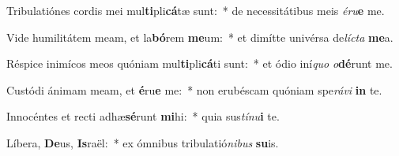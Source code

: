 \item Tribulatiónes cordis mei mul\textbf{ti}pli\textbf{cá}tæ sunt:~* de necessitátibus meis \textit{é}\textit{ru}\textbf{e} me.
\item Vide humilitátem meam, et la\textbf{bó}rem \textbf{me}um:~* et dimítte univérsa de\textit{líc}\textit{ta} \textbf{me}a.
\item Réspice inimícos meos quóniam mul\textbf{ti}pli\textbf{cá}ti sunt:~* et ódio iní\textit{quo} \textit{o}\textbf{dé}runt me.
\item Custódi ánimam meam, et \textbf{é}ru\textbf{e} me:~* non erubéscam quóniam spe\textit{rá}\textit{vi} \textbf{in} te.
\item Innocéntes et recti adhæ\textbf{sé}runt \textbf{mi}hi:~* quia sus\textit{tí}\textit{nu}\textbf{i} te.
\item Líbera, \textbf{De}us, \textbf{Is}raël:~* ex ómnibus tribulatió\textit{ni}\textit{bus} \textbf{su}is.
